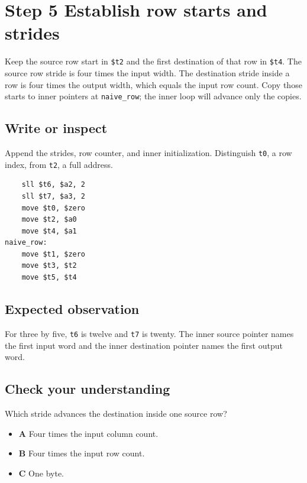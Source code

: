 \section{Step 5 Establish row starts and strides}\label{transpose-s05}

Keep the source row start in \texttt{\$t2} and the first destination of that row in \texttt{\$t4}. The source row stride is four times the input width. The destination stride inside a row is four times the output width, which equals the input row count. Copy those starts to inner pointers at \texttt{naive\_row}; the inner loop will advance only the copies.

\subsection{Write or inspect}
Append the strides, row counter, and inner initialization. Distinguish \texttt{t0}, a row index, from \texttt{t2}, a full address.

\begin{verbatim}
    sll $t6, $a2, 2
    sll $t7, $a3, 2
    move $t0, $zero
    move $t2, $a0
    move $t4, $a1
naive_row:
    move $t1, $zero
    move $t3, $t2
    move $t5, $t4
\end{verbatim}

\subsection{Expected observation}
For three by five, \texttt{t6} is twelve and \texttt{t7} is twenty. The inner source pointer names the first input word and the inner destination pointer names the first output word.

\subsection{Check your understanding}
Which stride advances the destination inside one source row?

\begin{itemize}
  \item \textbf{A} Four times the input column count.
  \item \textbf{B} Four times the input row count.
  \item \textbf{C} One byte.
\end{itemize}
